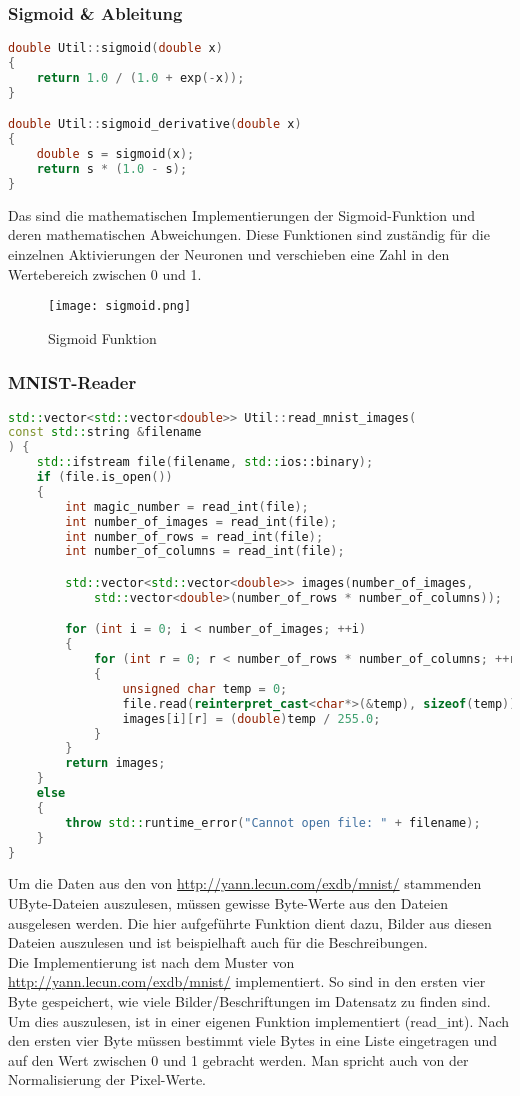 \subsubsection{Sigmoid \& Ableitung}
\label{sec:RealSigmoidAbleitungCode}
\begin{lstlisting}[language=c++]
double Util::sigmoid(double x) 
{
	return 1.0 / (1.0 + exp(-x));
}

double Util::sigmoid_derivative(double x)
{
	double s = sigmoid(x);
	return s * (1.0 - s);
}
\end{lstlisting}
Das sind die mathematischen Implementierungen der Sigmoid-Funktion und deren mathematischen Abweichungen. Diese Funktionen sind zuständig für die einzelnen Aktivierungen der Neuronen und verschieben eine Zahl in den Wertebereich zwischen 0 und 1.
\begin{figure}[H]
	\centering
		\texttt{[image: sigmoid.png]}
		\caption{Sigmoid Funktion}
	\label{fig:sigmoid}
\end{figure}


\subsubsection{MNIST-Reader}
\label{sec:RealMNISTReaderCode}
\begin{lstlisting}[language=c++]
std::vector<std::vector<double>> Util::read_mnist_images(
const std::string &filename
) {
	std::ifstream file(filename, std::ios::binary);
	if (file.is_open()) 
	{
		int magic_number = read_int(file);
		int number_of_images = read_int(file);
		int number_of_rows = read_int(file);
		int number_of_columns = read_int(file);

		std::vector<std::vector<double>> images(number_of_images, 
			std::vector<double>(number_of_rows * number_of_columns));

		for (int i = 0; i < number_of_images; ++i) 
		{
			for (int r = 0; r < number_of_rows * number_of_columns; ++r) 
			{
				unsigned char temp = 0;
				file.read(reinterpret_cast<char*>(&temp), sizeof(temp));
				images[i][r] = (double)temp / 255.0;
			}
		}
		return images;
	} 
	else 
	{
		throw std::runtime_error("Cannot open file: " + filename);
	}
}
\end{lstlisting}
Um die Daten aus den von \url{http://yann.lecun.com/exdb/mnist/} stammenden UByte-Dateien auszulesen, müssen gewisse Byte-Werte aus den Dateien ausgelesen werden. Die hier aufgeführte Funktion dient dazu, Bilder aus diesen Dateien auszulesen und ist beispielhaft auch für die Beschreibungen.
\\
Die Implementierung ist nach dem Muster von \url{http://yann.lecun.com/exdb/mnist/} implementiert. So sind in den ersten vier Byte gespeichert, wie viele Bilder/Beschriftungen im Datensatz zu finden sind. Um dies auszulesen, ist in einer eigenen Funktion implementiert (read\_int). Nach den ersten vier Byte müssen bestimmt viele Bytes in eine Liste eingetragen und auf den Wert zwischen 0 und 1 gebracht werden. Man spricht auch von der Normalisierung der Pixel-Werte.
